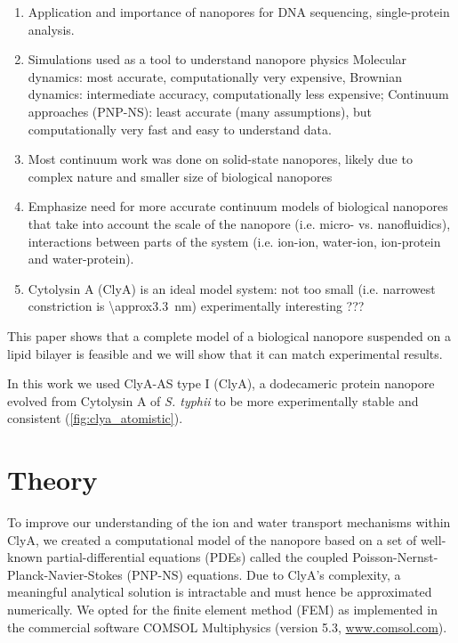 \documentclass[journal=ancac3, manuscript=article, etalmode=truncate,maxauthors=0]{achemso}
\begin{document}
\begin{enumerate}
	\item Application and importance of nanopores for DNA sequencing, single-protein analysis. 
	\item Simulations used as a tool to understand nanopore physics
	\subitem Molecular dynamics: most accurate, computationally very expensive,
	\subitem Brownian dynamics: intermediate accuracy, computationally less expensive;
	\subitem Continuum approaches (PNP-NS): least accurate (many assumptions), but computationally very fast and easy to understand data.
	\item Most continuum work was done on solid-state nanopores, likely due to complex nature and smaller size of biological nanopores
	\item Emphasize need for more accurate continuum models of biological nanopores that take into account
	\subitem the scale of the nanopore (i.e. micro- vs. nanofluidics),
	\subitem interactions between parts of the system (i.e. ion-ion, water-ion, ion-protein and water-protein).
	\item Cytolysin A (ClyA) is an ideal model system:
	\subitem not too small (i.e. narrowest constriction is \SI{\approx3.3}{\nano\meter})
	\subitem experimentally interesting
	\subitem ???
\end{enumerate}

This paper shows that a complete model of a biological nanopore suspended on a lipid bilayer is feasible and we will show that it can match experimental results.

In this work we used ClyA-AS type I (ClyA), a dodecameric protein nanopore evolved from Cytolysin A of \textit{S. typhii} to be more experimentally stable and consistent (\cref{fig:clya_atomistic}).\cite{soskine2013}




\section{Theory}
To improve our understanding of the ion and water transport mechanisms within ClyA,
we created a computational model of the nanopore based on a set of well-known partial-differential equations (PDEs) called the coupled Poisson-Nernst-Planck-Navier-Stokes (PNP-NS) equations.
Due to ClyA's complexity, a meaningful analytical solution is intractable and must hence be approximated numerically.
We opted for the finite element method (FEM) as implemented in the commercial software COMSOL Multiphysics (version 5.3, \href{www.comsol.com}{www.comsol.com}).
\end{document}
